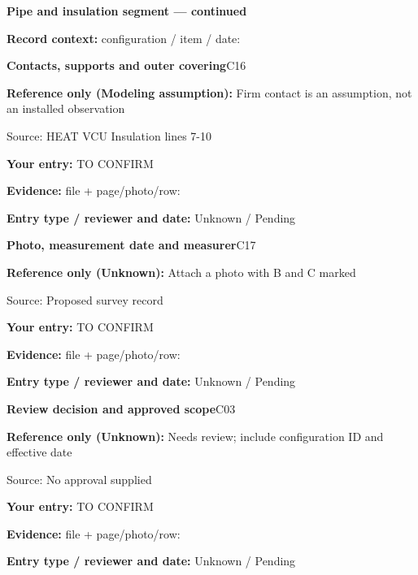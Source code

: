 \documentclass[11pt]{article}
\begin{document}
\clearpage
{\large\bfseries Pipe and insulation segment --- continued}\par
\textbf{Record context:} configuration / item / date: \hrulefill\par
\par\noindent\begin{minipage}{\textwidth}\small
{\color{navy}\bfseries Contacts, supports and outer covering}\hfill C16\par
\colorbox{pale}{\parbox{\dimexpr\linewidth-2\fboxsep\relax}{
\textbf{Reference only (Modeling assumption):} Firm contact is an assumption, not an installed observation\par
{\footnotesize Source: HEAT VCU Insulation lines 7-10}}}\par
\textbf{Your entry:} {\color{muted}TO CONFIRM}\enspace\hrulefill\par
{\footnotesize\textbf{Evidence:} file + page/photo/row: \hrulefill\par
\textbf{Entry type / reviewer and date:} Unknown / Pending\par
}\end{minipage}\par\vspace{5pt}
\par\noindent\begin{minipage}{\textwidth}\small
{\color{navy}\bfseries Photo, measurement date and measurer}\hfill C17\par
\colorbox{pale}{\parbox{\dimexpr\linewidth-2\fboxsep\relax}{
\textbf{Reference only (Unknown):} Attach a photo with B and C marked\par
{\footnotesize Source: Proposed survey record}}}\par
\textbf{Your entry:} {\color{muted}TO CONFIRM}\enspace\hrulefill\par
{\footnotesize\textbf{Evidence:} file + page/photo/row: \hrulefill\par
\textbf{Entry type / reviewer and date:} Unknown / Pending\par
}\end{minipage}\par\vspace{5pt}
\par\noindent\begin{minipage}{\textwidth}\small
{\color{navy}\bfseries Review decision and approved scope}\hfill C03\par
\colorbox{pale}{\parbox{\dimexpr\linewidth-2\fboxsep\relax}{
\textbf{Reference only (Unknown):} Needs review; include configuration ID and effective date\par
{\footnotesize Source: No approval supplied}}}\par
\textbf{Your entry:} {\color{muted}TO CONFIRM}\enspace\hrulefill\par
{\footnotesize\textbf{Evidence:} file + page/photo/row: \hrulefill\par
\textbf{Entry type / reviewer and date:} Unknown / Pending\par
}\end{minipage}\par\vspace{5pt}
\end{document}
